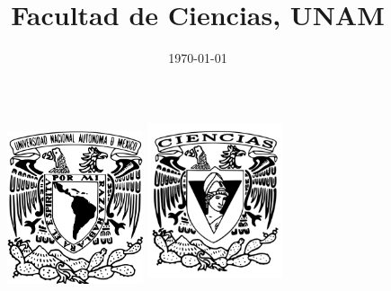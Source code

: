 \documentclass{article}
\title{Facultad de Ciencias, UNAM}
\date{\today}
\begin{document}
\thispagestyle{empty}
	
	\begin{figure}[ht]
			\includegraphics[width=4cm]{Logo_UNAM.png}
			\label{EscudoUNAM}
	   \endminipage
			\includegraphics[height = 4.9cm ,width=4cm]{Logo_FC.png}
			\label{EscudoFC}
		\endminipage
	\end{figure}
	
\end{document}
